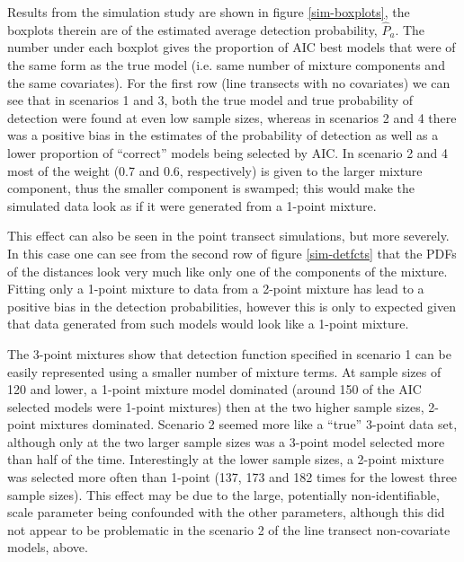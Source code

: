 Results from the simulation study are shown in figure \ref{sim-boxplots}, the boxplots therein are of the estimated average detection probability, $\hat{P}_a$. The number under each boxplot gives the proportion of AIC best models that were of the same form as the true model (i.e. same number of mixture components and the same covariates). For the first row (line transects with no covariates) we can see that in scenarios 1 and 3, both the true model and true probability of detection were found at even low sample sizes, whereas in scenarios 2 and 4 there was a positive bias in the estimates of the probability of detection as well as a lower proportion of ``correct'' models being selected by AIC. In scenario 2 and 4 most of the weight (0.7 and 0.6, respectively) is given to the larger mixture component, thus the smaller component is swamped; this would make the simulated data look as if it were generated from a 1-point mixture.

This effect can also be seen in the point transect simulations, but more severely. In this case one can see from the second row of figure \ref{sim-detfcts} that the PDFs of the distances look very much like only one of the components of the mixture. Fitting only a 1-point mixture to data from a 2-point mixture has lead to a positive bias in the detection probabilities, however this is only to expected given that data generated from such models would look like a 1-point mixture.

The 3-point mixtures show that detection function specified in scenario 1 can be easily represented using a smaller number of mixture terms. At sample sizes of 120 and lower, a 1-point mixture model dominated (around 150 of the AIC selected models were 1-point mixtures) then at the two higher sample sizes, 2-point mixtures dominated. Scenario 2 seemed more like a ``true'' 3-point data set, although only at the two larger sample sizes was a 3-point model selected more than half of the time. Interestingly at the lower sample sizes, a 2-point mixture was selected more often than 1-point (137, 173 and 182 times for the lowest three sample sizes). This effect may be due to the large, potentially non-identifiable, scale parameter being confounded with the other parameters, although this did not appear to be problematic in the scenario 2 of the line transect non-covariate models, above.

